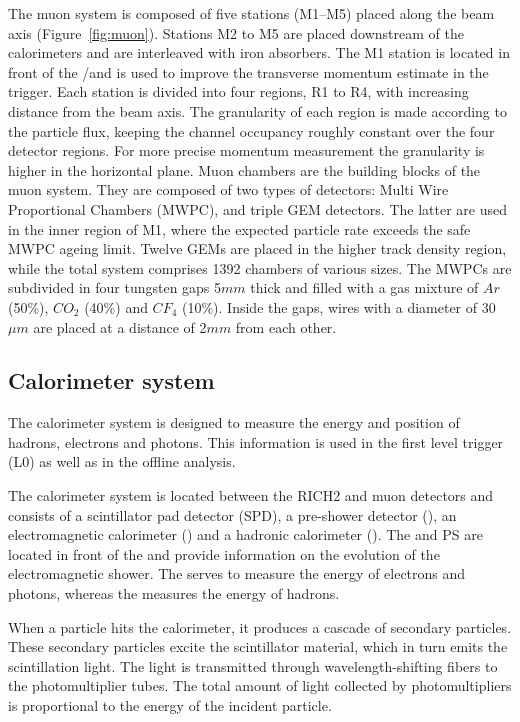 The muon system is composed of five stations (M1--M5) placed along the
beam axis (Figure~\ref{fig:muon}). Stations M2 to M5 are placed downstream of the
calorimeters and are interleaved with iron absorbers. The M1 station is
located in front of the \spd/\presh and is used to improve the transverse momentum
estimate in the trigger. Each station is divided into four regions, R1 to R4,
with increasing distance from the beam axis. The granularity of each region is
made according to the particle flux, keeping the channel occupancy roughly
constant over the four detector regions. For more precise momentum measurement
the granularity is higher in the horizontal plane.
Muon chambers are the building blocks of the muon system. They are composed of 
two types of detectors: Multi Wire Proportional Chambers (MWPC), and triple GEM detectors. 
The latter are used in the inner region of M1, where the expected particle rate exceeds 
the safe MWPC ageing limit. Twelve GEMs are placed in the higher track density region, 
while the total system comprises 1392 chambers of various sizes. The MWPCs are 
subdivided in four tungsten gaps 5$mm$ thick and filled with a gas mixture of 
$Ar$ (50\%), $CO_2$ (40\%) and $CF_4$ (10\%). Inside the gaps, wires with 
a diameter of 30$\mu m$ are placed at a distance of 2$mm$ from each other. 

\subsection{Calorimeter system}

The calorimeter system is designed to measure the energy and position of
hadrons, electrons and photons. This information is used in the first level
trigger (L0) as well as in the offline analysis.

The calorimeter system is located between the RICH2 and muon detectors and
consists of a scintillator pad detector (SPD), a pre-shower detector (\presh), an
electromagnetic calorimeter (\ecal) and a hadronic calorimeter (\hcal). The \spd
and PS are located in front of the \ecal and provide information on the
evolution of the electromagnetic shower. The \ecal serves to measure the energy
of electrons and photons, whereas the \hcal measures the energy of hadrons.

When a particle hits the calorimeter, it produces a cascade of secondary
particles. These secondary particles excite the scintillator material, which in
turn emits the scintillation light. The light is transmitted through
wavelength-shifting fibers to the photomultiplier tubes. The total amount of
light collected by photomultipliers is proportional to the energy of the
incident particle.

